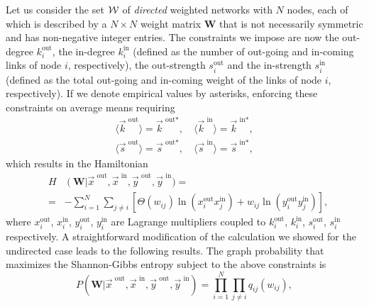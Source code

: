 \documentclass[aps,twocolumn,superscriptaddress]{revtex4-1}
\begin{document}
Let us consider the set $\cal{W}$ of \emph{directed} weighted networks with $N$ nodes, each of which is described by a $N\times N$ weight matrix $\bm{W}$ that is not necessarily symmetric and has non-negative integer entries.
The constraints we impose are now the out-degree $k^\textrm{out}_i$, the in-degree $k^\textrm{in}_i$ (defined as the number of out-going and in-coming links of node $i$, respectively), the out-strength $s^\textrm{out}_i$ and the in-strength $s^\textrm{in}_i$ (defined as the total out-going  and in-coming weight of the links of node $i$, respectively).
If we denote empirical values by asterisks, enforcing these constraints on average means requiring
\begin{eqnarray}
&\langle \vec{k}^\textrm{ out}\rangle=\vec{k}^{\textrm{ out}\ast},\quad 
\langle \vec{k}^\textrm{ in}\rangle=\vec{k}^{\textrm{ in}\ast},&\\
&\langle \vec{s}^\textrm{ out}\rangle=\vec{s}^{\textrm{ out}\ast},\quad 
\langle \vec{s}^\textrm{ in}\rangle=\vec{s}^{\textrm{ in}\ast},&
\end{eqnarray}
which results in the Hamiltonian 
\begin{eqnarray}
%
&H&\left( \bm{W} \right|\vec{x}^\textrm{ out},\vec{x}^\textrm { in},\vec{y}^\textrm{ out},\vec{y}^\textrm{ in})=\\
&=& -\sum_{i=1}^N\sum_{j\ne i} \left[ \Theta(w_{ij})\ln(x^\textrm{out}_i x^\textrm{in}_j)+  w_{ij}\ln(y^\textrm{out}_iy^\textrm{in}_j) \right],\nonumber
%
\end{eqnarray}
where $x^\textrm{out}_i$, $x^\textrm{in}_i$, $y^\textrm{out}_i$, $y^\textrm{in}_i$ are Lagrange multipliers coupled to $k^\textrm{out}_i$, $k^\textrm{in}_i$, $s^\textrm{out}_i$, $s^\textrm{in}_i$ respectively.
A straightforward modification of the calculation we showed for the undirected case leads to the following results.
The graph probability that maximizes the Shannon-Gibbs entropy 
subject to the above constraints is
\begin{equation}
%
P(\bm{W}|\vec{x}^\textrm{ out},\vec{x}^\textrm { in},\vec{y}^\textrm{ out},\vec{y}^\textrm{ in}) 
=\prod_{i=1}^N \prod_{j\ne i} q_{ij}(w_{ij}),
\end{equation}
\end{document}
